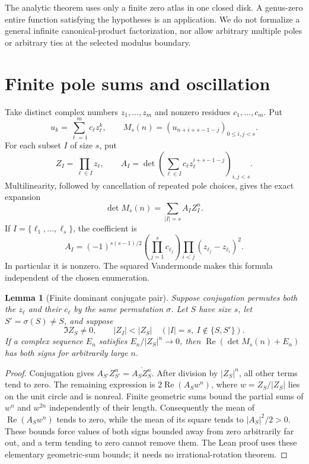 \documentclass[11pt]{amsart}
\newtheorem{lemma}[theorem]{Lemma}
\newcommand{\Repart}{\operatorname{Re}}
\begin{document}
The analytic theorem uses only a finite zero atlas in one closed disk. A genus-zero entire function satisfying the hypotheses is an application. We do not formalize a general infinite canonical-product factorization, nor allow arbitrary multiple poles or arbitrary ties at the selected modulus boundary.

\section{Finite pole sums and oscillation}
Take distinct complex numbers $z_1,\ldots,z_m$ and nonzero residues $c_1,\ldots,c_m$. Put
\[
 u_k=\sum_{\ell=1}^m c_\ell z_\ell^k,\qquad
 M_s(n)=(u_{n+i+s-1-j})_{0\le i,j<s}.
\]
For each subset $I$ of size $s$, put
\[
 Z_I=\prod_{\ell\in I}z_\ell,\qquad
 A_I=\det\left(\sum_{\ell\in I}c_\ell z_\ell^{i+s-1-j}\right)_{i,j<s}.
\]
Multilinearity, followed by cancellation of repeated pole choices, gives the exact expansion
\begin{equation}\label{eq:subset}
 \det M_s(n)=\sum_{|I|=s} A_I Z_I^n.
\end{equation}
If $I=\{\ell_1,\ldots,\ell_s\}$, the coefficient is
\begin{equation}\label{eq:leading}
 A_I=(-1)^{s(s-1)/2}
       \left(\prod_{j=1}^s c_{\ell_j}\right)
       \prod_{i<j}(z_{\ell_j}-z_{\ell_i})^2.
\end{equation}
In particular it is nonzero. The squared Vandermonde makes this formula independent of the chosen enumeration.

\begin{lemma}[Finite dominant conjugate pair]\label{lem:finite}
Suppose conjugation permutes both the $z_\ell$ and their $c_\ell$ by the same permutation $\sigma$. Let $S$ have size $s$, let $S'=\sigma(S)\ne S$, and suppose
\[
 \Im Z_S\ne0,\qquad
 |Z_I|<|Z_S|\quad (|I|=s,\ I\notin\{S,S'\}).
\]
If a complex sequence $E_n$ satisfies $E_n/|Z_S|^n\longrightarrow0$, then
$\Repart(\det M_s(n)+E_n)$ has both signs for arbitrarily large $n$.
\end{lemma}

\begin{proof}
Conjugation gives $A_{S'}Z_{S'}^n=\overline{A_SZ_S^n}$.
After division by $|Z_S|^n$, all other terms tend to zero. The remaining expression is
$2\Repart(A_Sw^n)$, where $w=Z_S/|Z_S|$ lies on the unit circle and is nonreal.
Finite geometric sums bound the partial sums of $w^n$ and $w^{2n}$ independently of their length. Consequently the mean of $\Repart(A_Sw^n)$ tends to zero, while the mean of its square tends to $|A_S|^2/2>0$. These bounds force values of both signs bounded away from zero arbitrarily far out, and a term tending to zero cannot remove them. The Lean proof uses these elementary geometric-sum bounds; it needs no irrational-rotation theorem.
\end{proof}
\end{document}
